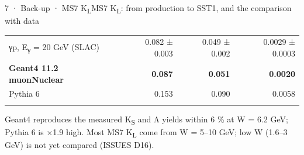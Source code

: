 \begin{btframe}{7 · Back-up · MS7 K\textsubscript{L}}{MS7 K\textsubscript{L}: from production to SST1, and the comparison with data}
\begin{minipage}[t]{\dimexpr(0.4444\linewidth-0.4444\dimexpr9.67pt\relax)}
{\begin{tabularx}{\linewidth}{>{\raggedright\arraybackslash}Xrrr}
γp, E\textsubscript{γ} = 20 GeV (SLAC) & 0.082 ± 0.003 & 0.049 ± 0.002 & 0.0029 ± 0.0003 \\\rowrule
\rowcolor{tint}\bfseries Geant4 11.2 muonNuclear & \bfseries 0.087 & \bfseries 0.051 & \bfseries 0.0020 \\\rowrule
Pythia 6 & 0.153 & 0.090 & 0.0058 \\\rowrule
\end{tabularx}\par}
\vspace{2.46pt}
{\fontsize{4.78pt}{6.45pt}\selectfont Geant4 reproduces the measured K\textsubscript{S} and Λ yields within 6 \% at W = 6.2 GeV; Pythia 6 is ×1.9 high. Most MS7 K\textsubscript{L} come from W = 5–10 GeV; low W (1.6–3 GeV) is not yet compared (ISSUES D16).\par}
\end{minipage}\par
{}
\end{btframe}

